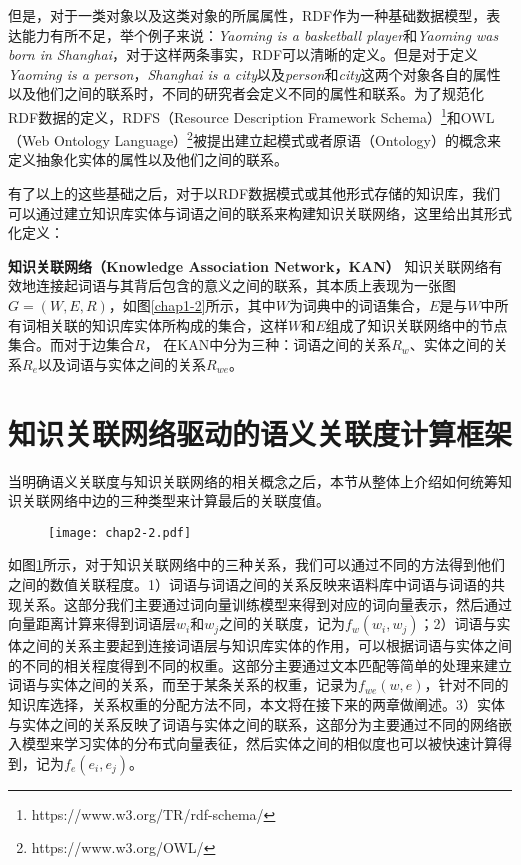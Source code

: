 但是，对于一类对象以及这类对象的所属属性，RDF作为一种基础数据模型，表达能力有所不足，举个例子来说：\emph{Yaoming is a basketball player}和\emph{Yaoming was born in Shanghai}，对于这样两条事实，RDF可以清晰的定义。但是对于定义\emph{Yaoming is a person}，\emph{Shanghai is a city}以及\emph{person}和\emph{city}这两个对象各自的属性以及他们之间的联系时，不同的研究者会定义不同的属性和联系。为了规范化RDF数据的定义，RDFS（Resource Description Framework Schema）\footnote{https://www.w3.org/TR/rdf-schema/}和OWL（Web Ontology Language）\footnote{https://www.w3.org/OWL/}被提出建立起模式或者原语（Ontology）的概念来定义抽象化实体的属性以及他们之间的联系。

有了以上的这些基础之后，对于以RDF数据模式或其他形式存储的知识库，我们可以通过建立知识库实体与词语之间的联系来构建知识关联网络，这里给出其形式化定义：
\begin{definition}
    \label{kan}
    {\bf 知识关联网络（Knowledge Association Network，KAN）}
    知识关联网络有效地连接起词语与其背后包含的意义之间的联系，其本质上表现为一张图$G=(W, E, R)$，如图\ref{chap1-2}所示，其中$W$为词典中的词语集合，$E$是与$W$中所有词相关联的知识库实体所构成的集合，这样$W$和$E$组成了知识关联网络中的节点集合。而对于边集合$R$， 在KAN中分为三种：词语之间的关系$R_w$、实体之间的关系$R_e$以及词语与实体之间的关系$R_{we}$。
\end{definition}


\section{知识关联网络驱动的语义关联度计算框架}
\label{chap02-sr}
当明确语义关联度与知识关联网络的相关概念之后，本节从整体上介绍如何统筹知识关联网络中边的三种类型来计算最后的关联度值。

\begin{figure}[!ht]
    \centerline{\texttt{[image: chap2-2.pdf]}}
    \label{chap2-2}
\end{figure}

如图\ref{chap2-2}所示，对于知识关联网络中的三种关系，我们可以通过不同的方法得到他们之间的数值关联程度。1）词语与词语之间的关系反映来语料库中词语与词语的共现关系。这部分我们主要通过词向量训练模型来得到对应的词向量表示，然后通过向量距离计算来得到词语层$w_i$和$w_j$之间的关联度，记为$f_w(w_i, w_j)$；2）词语与实体之间的关系主要起到连接词语层与知识库实体的作用，可以根据词语与实体之间的不同的相关程度得到不同的权重。这部分主要通过文本匹配等简单的处理来建立词语与实体之间的关系，而至于某条关系的权重，记录为$f_{we}(w, e)$，针对不同的知识库选择，关系权重的分配方法不同，本文将在接下来的两章做阐述。3）实体与实体之间的关系反映了词语与实体之间的联系，这部分为主要通过不同的网络嵌入模型来学习实体的分布式向量表征，然后实体之间的相似度也可以被快速计算得到，记为$f_{e}(e_i, e_j)$。

